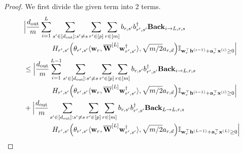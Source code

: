 		\begin{proof}
			We first divide the given term into 2 terms.
			\begingroup
			\allowdisplaybreaks
			\begin{align}
				&\Big|\frac{d_{\mathrm{out}} }{m} \sum_{i=1}^{L}  \sum_{s' \in [d_{\mathrm{out}} ]: s' \ne s} \sum_{r' \in [p]} \sum_{r \in [m]}  b_{r, s'} b_{r', s'}^{\dagger} \mathbf{Back}_{i \to L, r, s} \nonumber\\& \quad \quad \quad \quad H_{r', s'}\Big(\theta_{r', s'} \langle \mathbf{w}_{r}, \overline{\mathbf{W}}^{[L]} \mathbf{w}_{r', s'}^{\dagger}\rangle , \sqrt{m/2} a_{r, d}\Big) \mathbb{I}_{\mathbf{w}_r^{\top} \mathbf{h}^{(i-1)} + \mathbf{a}_r^{\top} \mathbf{x}^{(i)} \ge 0}\Big| \nonumber\\&
				\le \Big|\frac{d_{\mathrm{out}} }{m} \sum_{i=1}^{L-1}  \sum_{s' \in [d_{\mathrm{out}} ]: s' \ne s} \sum_{r' \in [p]} \sum_{r \in [m]}  b_{r, s'} b_{r', s'}^{\dagger} \mathbf{Back}_{i \to L, r, s} \nonumber\\& \quad \quad \quad \quad H_{r', s'}\Big(\theta_{r', s'} \langle \mathbf{w}_{r}, \overline{\mathbf{W}}^{[L]} \mathbf{w}_{r', s'}^{\dagger}\rangle , \sqrt{m/2} a_{r, d}\Big) \mathbb{I}_{\mathbf{w}_r^{\top} \mathbf{h}^{(i-1)} + \mathbf{a}_r^{\top} \mathbf{x}^{(i)} \ge 0}\Big|\label{eq:UpuntilL-1}\\&
				+ \Big|\frac{d_{\mathrm{out}} }{m}  \sum_{s' \in [d_{\mathrm{out}} ]: s' \ne s} \sum_{r' \in [p]} \sum_{r \in [m]}  b_{r, s'} b_{r', s'}^{\dagger} \mathbf{Back}_{L \to L, r, s} \nonumber\\& \quad \quad \quad \quad H_{r', s'}\Big(\theta_{r', s'} \langle \mathbf{w}_{r}, \overline{\mathbf{W}}^{[L]} \mathbf{w}_{r', s'}^{\dagger}\rangle , \sqrt{m/2} a_{r, d}\Big) \mathbb{I}_{\mathbf{w}_r^{\top} \mathbf{h}^{(L-1)} + \mathbf{a}_r^{\top} \mathbf{x}^{(L)} \ge 0}\Big|\label{eq:equal2L}
			\end{align}
			\endgroup
			

\end{proof}
